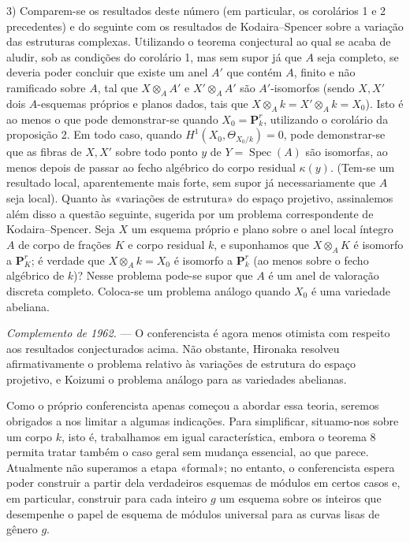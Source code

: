 3) Comparem-se os resultados deste número (em particular, os corolários 1 e
2 precedentes) e do seguinte com os resultados de Kodaira--Spencer sobre a
variação das estruturas complexas. Utilizando o teorema conjectural ao qual
se acaba de aludir, sob as condições do corolário 1, mas sem supor já
que $A$ seja completo, se deveria poder concluir que existe um anel $A'$ que
contém $A$, finito e não ramificado sobre $A$, tal que $X\otimes_A A'$ e
$X'\otimes_A A'$ são $A'$-isomorfos (sendo $X,X'$ dois $A$-esquemas próprios e
planos dados, tais que $X\otimes_A k=X'\otimes_A k=X_0$). Isto é ao menos o
que pode demonstrar-se quando $X_0=\mathbf P_k^r$, utilizando o corolário da
proposição 2. Em todo caso, quando $H^1(X_0,\Theta_{X_0/k})=0$, pode
demonstrar-se que as fibras de $X,X'$ sobre todo ponto $y$ de
$Y=\operatorname{Spec}(A)$ são isomorfas, ao menos depois de passar ao
fecho algébrico do corpo residual $\kappa(y)$. (Tem-se um resultado
local, aparentemente mais forte, sem supor já necessariamente que $A$ seja
local). Quanto às «variações de estrutura» do espaço projetivo,
assinalemos além disso a questão seguinte, sugerida por um problema correspondente
de Kodaira--Spencer. Seja $X$ um esquema próprio e plano sobre o anel local
íntegro $A$ de corpo de frações $K$ e corpo residual $k$, e suponhamos que
$X\otimes_A K$ é isomorfo a $\mathbf P_K^r$; é verdade que
$X\otimes_A k=X_0$ é isomorfo a $\mathbf P_k^r$ (ao menos sobre o fecho
algébrico de $k$)? Nesse problema pode-se supor que $A$ é um anel de
valoração discreta completo. Coloca-se um problema análogo quando $X_0$ é
uma variedade abeliana.

\emph{Complemento de 1962.} --- O conferencista é agora menos otimista
com respeito aos resultados conjecturados acima. Não obstante, Hironaka resolveu
afirmativamente o problema relativo às variações de estrutura
do espaço projetivo, e Koizumi o problema análogo para as variedades
abelianas.


Como o próprio conferencista apenas começou a abordar essa teoria, seremos
obrigados a nos limitar a algumas indicações. Para simplificar, situamo-nos
sobre um corpo $k$, isto é, trabalhamos em igual característica, embora o
teorema 8 permita tratar também o caso geral sem mudança essencial, ao que
parece. Atualmente não superamos a etapa «formal»; no entanto, o
conferencista espera poder construir a partir dela verdadeiros esquemas de
módulos em certos casos e, em particular, construir para cada inteiro $g$ um
esquema sobre os inteiros que desempenhe o papel de esquema de módulos universal
para as curvas lisas de gênero $g$.

